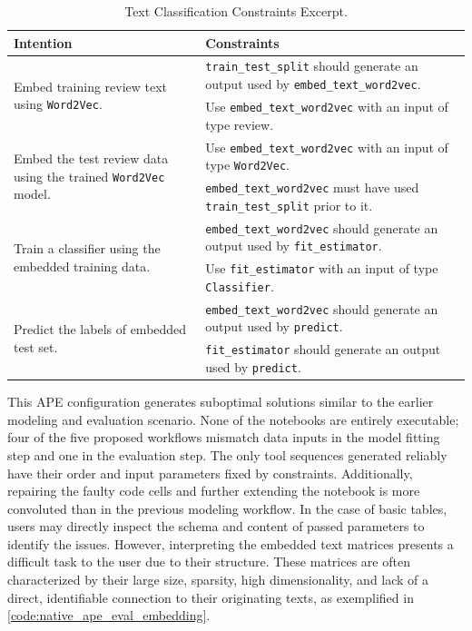 \begin{table}[h]
\centering
\footnotesize
\begin{tabular}{|p{}|p{}|}
\hline
\textbf{Intention} & \textbf{Constraints} \\
\hline
\multirow{2}{=}{Embed training review text using \texttt{Word2Vec}.} & \verb|train_test_split| should generate an output used by \verb|embed_text_word2vec|. \\
\cline{2-2}
& Use \verb|embed_text_word2vec| with an input of type review. \\
\hline
\multirow{2}{=}{Embed the test review data using the trained \texttt{Word2Vec} model.} & Use \verb|embed_text_word2vec| with an input of type \verb|Word2Vec|. \\
\cline{2-2}
& \verb|embed_text_word2vec| must have used \verb|train_test_split| prior to it. \\
\hline
\multirow{2}{=}{Train a classifier using the embedded training data.} & \verb|embed_text_word2vec| should generate an output used by \verb|fit_estimator|. \\
\cline{2-2}
& Use \verb|fit_estimator| with an input of type \verb|Classifier|. \\
\hline
\multirow{2}{=}{Predict the labels of embedded test set.} & \verb|embed_text_word2vec| should generate an output used by \verb|predict|. \\
\cline{2-2}
& \verb|fit_estimator| should generate an output used by \verb|predict|. \\
\hline
\end{tabular}
\caption{Text Classification Constraints Excerpt.}
\label{table:native_ape_text_classification_constraints}
\end{table}

This APE configuration generates suboptimal solutions similar to the earlier modeling and evaluation scenario. None of the notebooks are entirely executable; four of the five proposed workflows mismatch data inputs in the model fitting step and one in the evaluation step. The only tool sequences generated reliably have their order and input parameters fixed by constraints. Additionally, repairing the faulty code cells and further extending the notebook is more convoluted than in the previous modeling workflow. In the case of basic tables, users may directly inspect the schema and content of passed parameters to identify the issues. However, interpreting the embedded text matrices presents a difficult task to the user due to their structure. These matrices are often characterized by their large size, sparsity, high dimensionality, and lack of a direct, identifiable connection to their originating texts, as exemplified in \autoref{code:native_ape_eval_embedding}.

